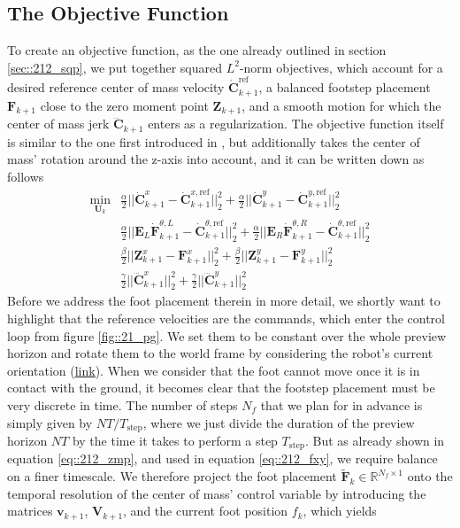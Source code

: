 \subsection{The Objective Function}
To create an objective function, as the one already outlined in section \ref{sec::212_sqp}, we put together squared $L^2$-norm objectives, which account for a desired reference center of mass velocity $\dot{\bm{C}}_{k+1}^\text{ref}$, a balanced footstep placement $\textbf{F}_{k+1}$ close to the zero moment point $\bm{Z}_{k+1}$, and a smooth motion for which the center of mass jerk $\dddot{\bm{C}}_{k+1}$ enters as a regularization. The objective function itself is similar to the one first introduced in \cite{herdt2010online}, but additionally takes the center of mass' rotation around the z-axis into account, and it can be written down as follows
\begin{align}
	\min_{\bm{U}_k} &\frac{\alpha}{2}||\dot{\bm{C}}^x_{k+1} - \dot{\bm{C}}_{k+1}^{x,\text{ref}}||_2^2 + \frac{\alpha}{2}||\dot{\bm{C}}^y_{k+1} - \dot{\bm{C}}_{k+1}^{y,\text{ref}}||_2^2 
	\label{eq::212_dcxy}\\
	&\frac{\alpha}{2}||\bm{E}_L\dot{\bm{F}}^{\theta,L}_{k+1} - \dot{\bm{C}}_{k+1}^{\theta,\text{ref}}||_2^2 + 	\frac{\alpha}{2}||\bm{E}_R\dot{\bm{F}}^{\theta,R}_{k+1} - \dot{\bm{C}}_{k+1}^{\theta,\text{ref}}||_2^2 
	\label{eq::212_dftheta} \\
	&\frac{\beta}{2}||\bm{Z}^x_{k+1}-\bm{F}^x_{k+1}||^2_2 + \frac{\beta}{2}||\bm{Z}^y_{k+1}-\bm{F}^y_{k+1}||^2_2 
	\label{eq::212_fxy}\\
	&\frac{\gamma}{2}||\dddot{\bm{C}}_{k+1}^x||^2_2 + \frac{\gamma}{2}||\dddot{\bm{C}}_{k+1}^y||^2_2	
	\label{eq::212_dddcxy}
\end{align}
Before we address the foot placement therein in more detail, we shortly want to highlight that the reference velocities are the commands, which enter the control loop from figure \ref{fig::21_pg}. We set them to be constant over the whole preview horizon and rotate them to the world frame  by considering the robot's current orientation (\href{https://github.com/mhubii/nmpc_pattern_generator/blob/5a213044c927dc6aac9f7e32ce1e5fb472cd67bb/libs/pattern_generator/src/base_generator.cpp#L324}{\underline{link}}). When we consider that the foot cannot move once it is in contact with the ground, it becomes clear that the footstep placement must be very discrete in time. The number of steps $N_f$ that we plan for in advance is simply given by $NT/T_\text{step}$, where we just divide the duration of the preview horizon $NT$ by the time it takes to perform a step $T_\text{step}$. But as already shown in equation \ref{eq::212_zmp}, and used in equation \ref{eq::212_fxy}, we require balance on a finer timescale. We therefore project the foot placement $\tilde{\bm{F}}_k\in\mathbb{R}^{N_f\times1}$ onto the temporal resolution of the center of mass' control variable by introducing the matrices $\bm{v}_{k+1}$, $\bm{V}_{k+1}$, and the current foot position $f_k$, which yields
